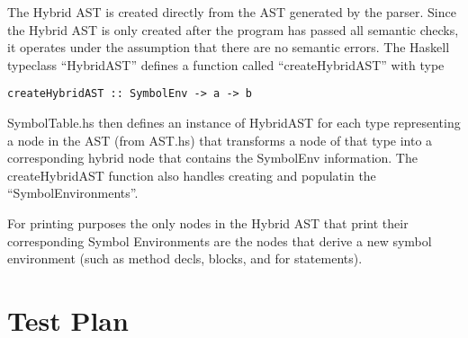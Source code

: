 \documentclass[11pt]{article}
\begin{document}
The Hybrid AST is created directly from the AST generated by the parser. Since the Hybrid AST is only created after the program has passed all semantic checks, it operates under the assumption that there are no semantic errors. The Haskell typeclass ``HybridAST'' defines a function called ``createHybridAST'' with type 
\begin{verbatim}
createHybridAST :: SymbolEnv -> a -> b
\end{verbatim} 

SymbolTable.hs then defines an instance of HybridAST for each type representing a node in the AST (from AST.hs) that transforms a node of that type into a corresponding hybrid node that contains the SymbolEnv information. The createHybridAST function also handles creating and populatin the ``SymbolEnvironments''.

For printing purposes the only nodes in the Hybrid AST that print their corresponding Symbol Environments are the nodes that derive a new symbol environment (such as method decls, blocks, and for statements). 

\section{Test Plan}
\end{document}
